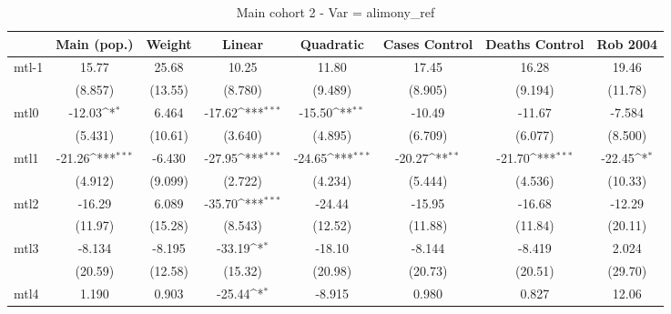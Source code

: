 \documentclass{article}
\begin{document}
{
\def\sym#1{\ifmmode^{#1}\else\(^{#1}\)\fi}
\begin{longtable}{l*{7}{c}}
\caption{Main cohort 2 - Var = alimony\_ref}\\
\hline\hline\endfirsthead\hline\endhead\hline\endfoot\endlastfoot
                &\multicolumn{1}{c}{Main (pop.)}&\multicolumn{1}{c}{Weight}&\multicolumn{1}{c}{Linear}&\multicolumn{1}{c}{Quadratic}&\multicolumn{1}{c}{Cases Control}&\multicolumn{1}{c}{Deaths Control}&\multicolumn{1}{c}{Rob 2004}\\
\hline
mtl-1           &    15.77         &    25.68         &    10.25         &    11.80         &    17.45         &    16.28         &    19.46         \\
                &  (8.857)         &  (13.55)         &  (8.780)         &  (9.489)         &  (8.905)         &  (9.194)         &  (11.78)         \\
mtl0            &   -12.03\sym{*}  &    6.464         &   -17.62\sym{***}&   -15.50\sym{**} &   -10.49         &   -11.67         &   -7.584         \\
                &  (5.431)         &  (10.61)         &  (3.640)         &  (4.895)         &  (6.709)         &  (6.077)         &  (8.500)         \\
mtl1            &   -21.26\sym{***}&   -6.430         &   -27.95\sym{***}&   -24.65\sym{***}&   -20.27\sym{**} &   -21.70\sym{***}&   -22.45\sym{*}  \\
                &  (4.912)         &  (9.099)         &  (2.722)         &  (4.234)         &  (5.444)         &  (4.536)         &  (10.33)         \\
mtl2            &   -16.29         &    6.089         &   -35.70\sym{***}&   -24.44         &   -15.95         &   -16.68         &   -12.29         \\
                &  (11.97)         &  (15.28)         &  (8.543)         &  (12.52)         &  (11.88)         &  (11.84)         &  (20.11)         \\
mtl3            &   -8.134         &   -8.195         &   -33.19\sym{*}  &   -18.10         &   -8.144         &   -8.419         &    2.024         \\
                &  (20.59)         &  (12.58)         &  (15.32)         &  (20.98)         &  (20.73)         &  (20.51)         &  (29.70)         \\
mtl4            &    1.190         &    0.903         &   -25.44\sym{*}  &   -8.915         &    0.980         &    0.827         &    12.06         \\

\end{longtable}}
\end{document}
